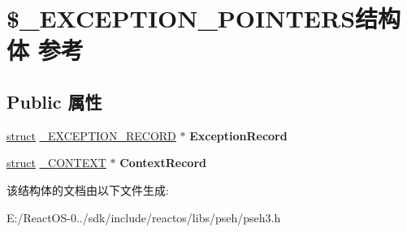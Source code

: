 \hypertarget{struct_0B___e_x_c_e_p_t_i_o_n___p_o_i_n_t_e_r_s}{}\section{\$\+\_\+\+E\+X\+C\+E\+P\+T\+I\+O\+N\+\_\+\+P\+O\+I\+N\+T\+E\+R\+S结构体 参考}
\label{struct_0B___e_x_c_e_p_t_i_o_n___p_o_i_n_t_e_r_s}
\subsection*{Public 属性}
\begin{DoxyCompactItemize}
\item 
\mbox{\label{struct_0B___e_x_c_e_p_t_i_o_n___p_o_i_n_t_e_r_s_ac3535a800e6ec1d3aca62f9aa95d660b}} 
\hyperlink{interfacestruct}{struct} \hyperlink{struct___e_x_c_e_p_t_i_o_n___r_e_c_o_r_d}{\+\_\+\+E\+X\+C\+E\+P\+T\+I\+O\+N\+\_\+\+R\+E\+C\+O\+RD} $\ast$ {\bfseries Exception\+Record}
\item 
\mbox{\label{struct_0B___e_x_c_e_p_t_i_o_n___p_o_i_n_t_e_r_s_abb0b3293bd0603250a17fe148653c907}} 
\hyperlink{interfacestruct}{struct} \hyperlink{struct___c_o_n_t_e_x_t}{\+\_\+\+C\+O\+N\+T\+E\+XT} $\ast$ {\bfseries Context\+Record}
\end{DoxyCompactItemize}


该结构体的文档由以下文件生成\+:\begin{DoxyCompactItemize}
\item 
E\+:/\+React\+O\+S-\/0../sdk/include/reactos/libs/pseh/pseh3.\+h\end{DoxyCompactItemize}
